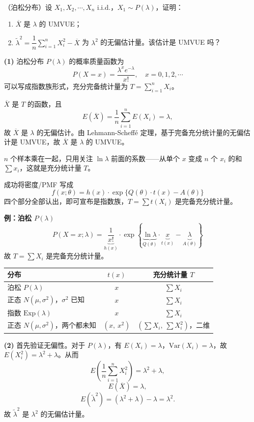 \begin{homework}[11]
（泊松分布）设 $X_1, X_2, \cdots, X_n$ i.i.d.，$X_1 \sim P(\lambda)$，证明：
\begin{enumerate}[(1)]
    \item $\overline{X}$ 是 $\lambda$ 的 UMVUE；
    \item $\tilde{\lambda}^2 = \dfrac{1}{n}\sum_{i=1}^{n} X_i^2 - \overline{X}$ 为 $\lambda^2$ 的无偏估计量。该估计是 UMVUE 吗？
\end{enumerate}
\end{homework}
\begin{solution}
\textbf{(1)} 泊松分布 $P(\lambda)$ 的概率质量函数为
\[
P(X = x) = \frac{\lambda^x e^{-\lambda}}{x!}, \quad x = 0, 1, 2, \cdots
\]
可以写成指数族形式，充分完备统计量为 $T = \sum_{i=1}^n X_i$。

$\overline{X}$ 是 $T$ 的函数，且
\[
E(\overline{X}) = \frac{1}{n} \sum_{i=1}^n E(X_i) = \lambda,
\]
故 $\overline{X}$ 是 $\lambda$ 的无偏估计。由 Lehmann-Scheffé 定理，基于完备充分统计量的无偏估计是 UMVUE，故 $\overline{X}$ 是 $\lambda$ 的 UMVUE。
\begin{dxtips}
$n$ 个样本乘在一起，只用关注 $\ln\lambda$ 前面的系数——从单个 $x$ 变成 $n$ 个 $x_i$ 的和 $\sum x_i$，这就是充分统计量 $T$。
\end{dxtips}
\begin{dxtips}
    [判定指数族的标准]
成功将密度/PMF 写成
$$f(x;\theta) = h(x)\cdot\exp\{Q(\theta)\cdot t(x) - A(\theta)\}$$
四个部分全部认出，即可宣布是指数族，$T=\sum t(X_i)$ 是完备充分统计量。

\textbf{例：泊松 $P(\lambda)$}
$$P(X=x;\lambda) = \underbrace{\frac{1}{x!}}_{h(x)}\cdot\exp\!\left\{\underbrace{\ln\lambda}_{Q(\theta)}\cdot\underbrace{x}_{t(x)} - \underbrace{\lambda}_{A(\theta)}\right\}$$
故 $T = \sum X_i$ 是完备充分统计量。

\end{dxtips}
\begin{note}[常见指数族的充分统计量]
\begin{center}
\begin{tabular}{lcc}
\hline
分布 & $t(x)$ & 充分统计量 $T$ \\
\hline
泊松 $P(\lambda)$ & $x$ & $\sum X_i$ \\
正态 $N(\mu,\sigma^2)$，$\sigma^2$ 已知 & $x$ & $\sum X_i$ \\
指数 $\mathrm{Exp}(\lambda)$ & $x$ & $\sum X_i$ \\
正态 $N(\mu,\sigma^2)$，两个都未知 & $(x,\ x^2)$ & $(\sum X_i,\ \sum X_i^2)$，二维 \\
\hline
\end{tabular}
\end{center}
\end{note}
\textbf{(2)} 首先验证无偏性。对于 $P(\lambda)$，有 $E(X_i) = \lambda$，$\mathrm{Var}(X_i) = \lambda$，故 $E(X_i^2) = \lambda^2 + \lambda$。从而
\[
E\!\left(\frac{1}{n}\sum_{i=1}^n X_i^2\right) = \lambda^2 + \lambda,
\]
\[
E(\overline{X}) = \lambda,
\]
\[
E(\tilde{\lambda}^2) = (\lambda^2 + \lambda) - \lambda = \lambda^2.
\]
故 $\tilde{\lambda}^2$ 是 $\lambda^2$ 的无偏估计量。


\end{solution}
